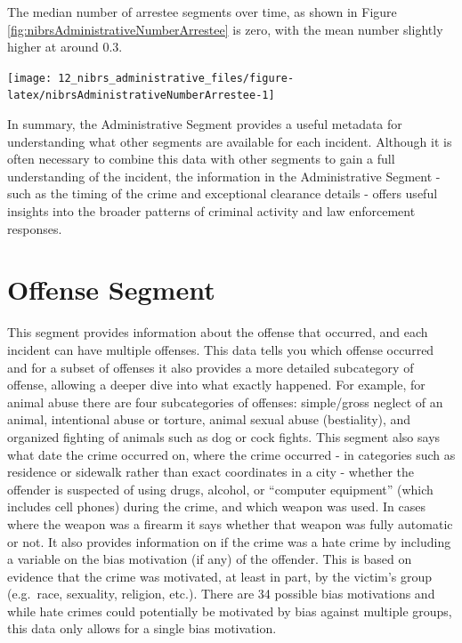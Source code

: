\documentclass[
]{krantz}
\let\origfigure\figure
\let\endorigfigure\endfigure
\renewenvironment{figure}[1][2] {
    \expandafter\origfigure\expandafter[H]
} {
    \endorigfigure
}
\begin{document}
The median number of arrestee segments over time, as shown
in Figure \ref{fig:nibrsAdministrativeNumberArrestee} is
zero, with the mean number slightly higher at around 0.3.

\begin{figure}

{\centering \texttt{[image: 12\_nibrs\_administrative\_files/figure-latex/nibrsAdministrativeNumberArrestee-1]} 

}

\caption{Annual mean and median number of Arrestee Segments, 1991-2022.}\label{fig:nibrsAdministrativeNumberArrestee}
\end{figure}

In summary, the Administrative Segment provides a useful
metadata for understanding what other segments are available
for each incident. Although it is often necessary to combine
this data with other segments to gain a full understanding
of the incident, the information in the Administrative
Segment - such as the timing of the crime and exceptional
clearance details - offers useful insights into the broader
patterns of criminal activity and law enforcement responses.

\chapter{Offense Segment}\label{offenseSegment}

This segment provides information about the offense that
occurred, and each incident can have multiple offenses. This
data tells you which offense occurred and for a subset of
offenses it also provides a more detailed subcategory of
offense, allowing a deeper dive into what exactly happened.
For example, for animal abuse there are four subcategories
of offenses: simple/gross neglect of an animal, intentional
abuse or torture, animal sexual abuse (bestiality), and
organized fighting of animals such as dog or cock fights.
This segment also says what date the crime occurred on,
where the crime occurred - in categories such as residence
or sidewalk rather than exact coordinates in a city -
whether the offender is suspected of using drugs, alcohol,
or ``computer equipment'' (which includes cell phones)
during the crime, and which weapon was used. In cases where
the weapon was a firearm it says whether that weapon was
fully automatic or not. It also provides information on if
the crime was a hate crime by including a variable on the
bias motivation (if any) of the offender. This is based on
evidence that the crime was motivated, at least in part, by
the victim's group (e.g.~race, sexuality, religion, etc.).
There are 34 possible bias motivations and while hate crimes
could potentially be motivated by bias against multiple
groups, this data only allows for a single bias motivation.
\end{document}
